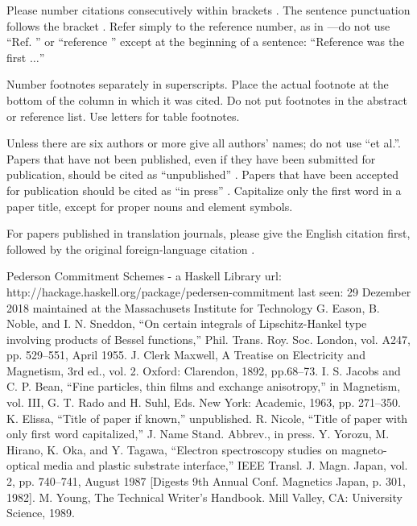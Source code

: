 \documentclass[conference]{IEEEtran}
\begin{document}
Please number citations consecutively within brackets \cite{b1}. The 
sentence punctuation follows the bracket \cite{b2}. Refer simply to the reference 
number, as in \cite{b3}---do not use ``Ref. \cite{b3}'' or ``reference \cite{b3}'' except at 
the beginning of a sentence: ``Reference \cite{b3} was the first $\ldots$''

Number footnotes separately in superscripts. Place the actual footnote at 
the bottom of the column in which it was cited. Do not put footnotes in the 
abstract or reference list. Use letters for table footnotes.

Unless there are six authors or more give all authors' names; do not use 
``et al.''. Papers that have not been published, even if they have been 
submitted for publication, should be cited as ``unpublished'' \cite{b4}. Papers 
that have been accepted for publication should be cited as ``in press'' \cite{b5}. 
Capitalize only the first word in a paper title, except for proper nouns and 
element symbols.

For papers published in translation journals, please give the English 
citation first, followed by the original foreign-language citation \cite{b6}.

\begin{thebibliography}{00}
	 Pederson Commitment Schemes - a Haskell Library url: http://hackage.haskell.org/package/pedersen-commitment 
	last seen: 29 Dezember 2018
	maintained at the Massachusets Institute for Technology
 G. Eason, B. Noble, and I. N. Sneddon, ``On certain integrals of Lipschitz-Hankel type involving products of Bessel functions,'' Phil. Trans. Roy. Soc. London, vol. A247, pp. 529--551, April 1955.
 J. Clerk Maxwell, A Treatise on Electricity and Magnetism, 3rd ed., vol. 2. Oxford: Clarendon, 1892, pp.68--73.
 I. S. Jacobs and C. P. Bean, ``Fine particles, thin films and exchange anisotropy,'' in Magnetism, vol. III, G. T. Rado and H. Suhl, Eds. New York: Academic, 1963, pp. 271--350.
 K. Elissa, ``Title of paper if known,'' unpublished.
 R. Nicole, ``Title of paper with only first word capitalized,'' J. Name Stand. Abbrev., in press.
 Y. Yorozu, M. Hirano, K. Oka, and Y. Tagawa, ``Electron spectroscopy studies on magneto-optical media and plastic substrate interface,'' IEEE Transl. J. Magn. Japan, vol. 2, pp. 740--741, August 1987 [Digests 9th Annual Conf. Magnetics Japan, p. 301, 1982].
 M. Young, The Technical Writer's Handbook. Mill Valley, CA: University Science, 1989.
\end{thebibliography}
\vspace{12pt}
\end{document}
